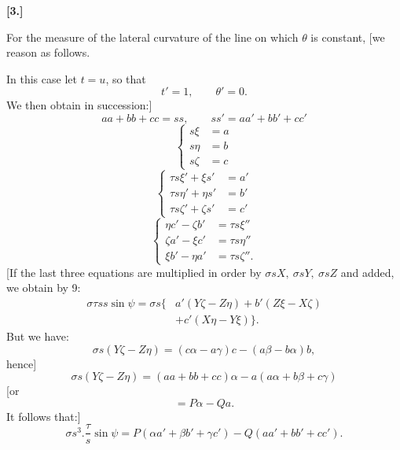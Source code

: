 %

\begin{center}\bfseries [3.]\end{center}
\noindent\hspace*{1.2em}For the measure of the lateral curvature of the line on which $\theta$ is constant, [we reason as follows.

In this case let $t=u$, so that
\[
t'=1,\qquad \theta'=0.
\]
We then obtain in succession:]
\begin{equation}\tag*{[$5'$]}
aa+bb+cc=ss,\qquad ss'=aa'+bb'+cc'
\end{equation}
\begin{equation}\tag*{[$4'$]}
\left\{\begin{aligned}s\xi&=a\\s\eta&=b\\s\zeta&=c\end{aligned}\right.
\end{equation}
\begin{equation}\tag*{[$12'$]}
\left\{\begin{aligned}
\tau s\xi'+\xi s'&=a'\\
\tau s\eta'+\eta s'&=b'\\
\tau s\zeta'+\zeta s'&=c'
\end{aligned}\right.
\end{equation}
\begin{equation}\tag*{[$8'$]}
\left\{\begin{aligned}
\eta c'-\zeta b'&=\tau s\xi''\\
\zeta a'-\xi c'&=\tau s\eta''\\
\xi b'-\eta a'&=\tau s\zeta''.
\end{aligned}\right.
\end{equation}
[If the last three equations are multiplied in order by $\sigma sX,\ \sigma sY,\ \sigma sZ$ and added, we obtain by 9:
\[
\begin{aligned}
\sigma\tau ss\sin\psi=\sigma s\{&a'(Y\zeta-Z\eta)+b'(Z\xi-X\zeta)\\
&+c'(X\eta-Y\xi)\}.
\end{aligned}
\]
But we have:
\[
\sigma s(Y\zeta-Z\eta)=(c\alpha-a\gamma)c-(a\beta-b\alpha)b,
\]
hence]
\[
\sigma s(Y\zeta-Z\eta)=(aa+bb+cc)\alpha-a(a\alpha+b\beta+c\gamma)
\]
[or
\[
=P\alpha-Qa.
\]
It follows that:]
\[
\sigma s^3.\frac{\tau}{s}\sin\psi=P(\alpha a'+\beta b'+\gamma c')-Q(aa'+bb'+cc').
\]
